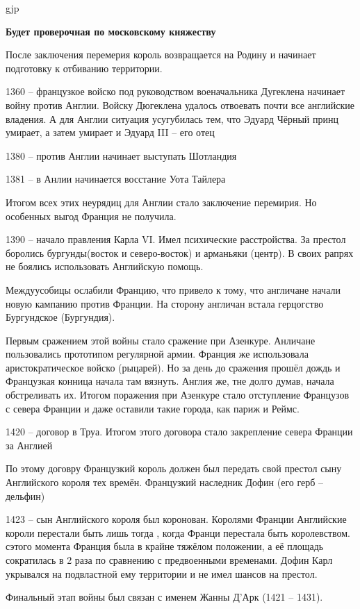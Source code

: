 gjp	 \documentclass[12pt,a4paper]{article}
\begin{document}
\textbf{{\Huge Будет проверочная по московскому княжеству}}

После заключения перемерия король возвращается на Родину и начинает подготовку к отбиванию территории.

1360 -- французкое войско под руководством военачальника Дугеклена начинает войну против Англии. Войску Дюгеклена удалось отвоевать почти все английские владения. А для Англии ситуация усугубилась тем, что Эдуард Чёрный принц умирает, а затем умирает и Эдуард III -- его отец

1380 -- против Англии начинает выступать Шотландия

1381 -- в Анлии начинается восстание Уота Тайлера

Итогом всех этих неурядиц для Англии стало заключение перемирия. Но особенных выгод Франция не получила. 

1390 -- начало правления Карла VI. Имел психические расстройства. За престол боролись бургунды(восток и северо-восток) и арманьяки (центр). В своих рапрях не боялись использовать Английскую помощь. 

Междуусобицы ослабили Францию, что привело к тому, что англичане начали новую кампанию против Франции. На сторону англичан встала герцогство Бургундское (Бургундия). 

Первым сражением этой войны стало сражение при Азенкуре. Анличане пользовались прототипом регулярной армии. Франция же использовала аристократическое войско (рыцарей). Но за день до сражения прошёл дождь и Французкая конница начала там вязнуть. Англия же, тне долго думав, начала обстреливать их.
Итогом поражения при Азенкуре стало отступление Французов с севера Франции и даже оставили такие города, как париж и Реймс.

1420 -- договор в Труа. Итогом этого договора стало закрепление севера Франции за Англией

По этому договру Французкий король должен был передать свой престол сыну Английского короля тех времён. Французкий наследник Дофин (его герб -- дельфин)

1423 -- сын Английского короля был коронован. Королями Франции Английские короли перестали быть лишь тогда , когда Франци перестала быть королевством.  сэтого момента Франция была в крайне тяжёлом положении, а её площадь сократилась в 2 раза по сравнению с предвоенными временами. Дофин Карл укрывался на подвластной ему территории и не имел шансов на престол.

Финальный этап войны был связан с именем Жанны Д'Арк (1421 -- 1431). 
\end{document}
